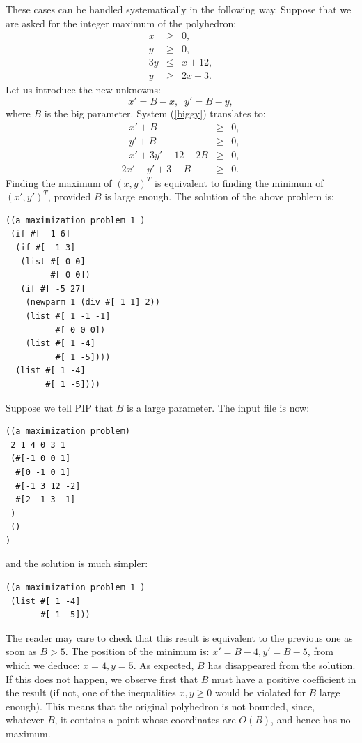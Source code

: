 \documentclass[12pt,a4paper]{article}
\begin{document}
These cases can be handled systematically in the following way. Suppose that
we are asked for the integer maximum of the polyhedron:
\begin{eqnarray}
x & \ge & 0, \nonumber \\
y & \ge & 0, \label{biggy}\\
3 y & \le & x + 12, \nonumber\\
y & \ge & 2 x - 3. \nonumber
\end{eqnarray}
Let us introduce the new unknowns:
\[ x'= B - x, \;\; y' = B - y ,\]
where $B$ is the big parameter. System (\ref{biggy}) translates to:
\begin{eqnarray*}
-x' + B & \ge & 0,\\
-y' + B & \ge & 0,\\
-x' + 3y' + 12 - 2B & \ge & 0,\\
2x' - y' + 3 - B & \ge & 0. 
\end{eqnarray*}
Finding the maximum of $(x,y)^T$ is equivalent to finding the minimum of
$(x', y')^T$, provided $B$ is large enough. The solution of the above
problem is:
\begin{verbatim}
((a maximization problem 1 )
 (if #[ -1 6]
  (if #[ -1 3]
   (list #[ 0 0]
         #[ 0 0])
   (if #[ -5 27]
    (newparm 1 (div #[ 1 1] 2))
    (list #[ 1 -1 -1]
          #[ 0 0 0])
    (list #[ 1 -4]
          #[ 1 -5])))
  (list #[ 1 -4]
        #[ 1 -5])))
\end{verbatim}

Suppose we tell PIP that $B$ is a large parameter. The input file is
now:
\begin{verbatim}
((a maximization problem)
 2 1 4 0 3 1
 (#[-1 0 0 1]
  #[0 -1 0 1]
  #[-1 3 12 -2]
  #[2 -1 3 -1]
 )
 ()
)
\end{verbatim}
and the solution is much simpler:
\begin{verbatim}
((a maximization problem 1 )
 (list #[ 1 -4]
       #[ 1 -5]))
\end{verbatim}
The reader may care to check that this result is equivalent to the
previous one as soon as $B > 5$. The position of the minimum is:
$x' = B - 4, y' = B - 5$, from which we deduce: $x = 4, y = 5$. As
expected, $B$ has disappeared from the solution. If this does not happen,
we observe first that $B$ must have a positive coefficient in the result
(if not, one of the inequalities $x, y \ge 0$ would be violated for $B$
large enough). This means that the original polyhedron is not bounded,
since, whatever $B$, it contains a point whose coordinates are $O(B)$,
and hence has no maximum.
\end{document}
